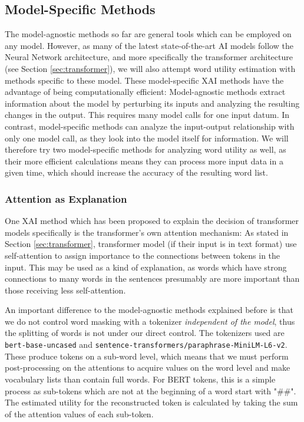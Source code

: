 \subsection{Model-Specific Methods}
The model-agnostic methods so far are general tools which can be employed on any model.
However, as many of the latest state-of-the-art AI models follow the Neural Network architecture, and more specifically the transformer architecture (see Section \ref{sec:transformer}), we will also attempt word utility estimation with methods specific to these model.
These model-specific XAI methods have the advantage of being computationally efficient:
Model-agnostic methods extract information about the model by perturbing its inputs and analyzing the resulting changes in the output.
This requires many model calls for one input datum.
In contrast, model-specific methods can analyze the input-output relationship with only one model call, as they look into the model itself for information.
We will therefore try two model-specific methods for analyzing word utility as well, as their more efficient calculations means they can process more input data in a given time, which should increase the accuracy of the resulting word list.

\subsubsection{Attention as Explanation}
One XAI method which has been proposed to explain the decision of transformer models specifically is the transformer's own attention mechanism:
As stated in Section \ref{sec:transformer}, transformer model (if their input is in text format) use self-attention to assign importance to the connections between tokens in the input.
This may be used as a kind of explanation, as words which have strong connections to many words in the sentences presumably are more important than those receiving less self-attention.

An important difference to the model-agnostic methods explained before is that we do not control word masking with a tokenizer \textit{independent of the model}, thus the splitting of words is not under our direct control.
The tokenizers used are \texttt{bert-base-uncased} and \texttt{sentence-transformers/paraphrase-MiniLM-L6-v2}.
These produce tokens on a sub-word level, which means that we must perform post-processing on the attentions to acquire values on the word level and make vocabulary lists than contain full words.
For BERT tokens, this is a simple process as sub-tokens which are not at the beginning of a word start with "\#\#".
The estimated utility for the reconstructed token is calculated by taking the sum of the attention values of each sub-token.

